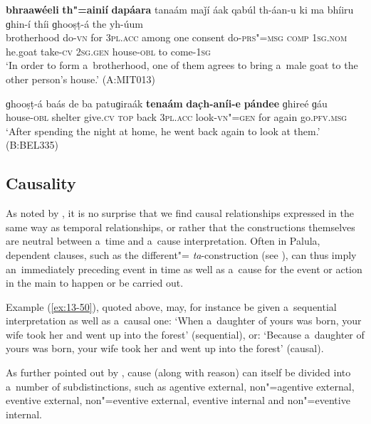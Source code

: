 \begin{exe}
\ex
\label{ex:13-84}
\gll \textbf{bhraawéeli} \textbf{th"=ainií} \textbf{dapáara} tanaám maǰí áak qabúl th-áan-u ki ma bhíiru ɡhin-í thíi ɡhooṣṭ-á the yh-úum \\
brotherhood do-\textsc{vn} for \textsc{3pl.acc} among one consent do-\textsc{prs"=msg} \textsc{comp} \textsc{1sg.nom} he.goat take-\textsc{cv} \textsc{2sg.gen}  house-\textsc{obl} to come-\textsc{1sg} \\
\glt `In order to form a~brotherhood, one of them agrees to bring a~male goat to the other person's house.' (A:MIT013)

\ex
\label{ex:13-85}
\gll ɡhooṣṭ-á baás de ba patuɡiraák \textbf{tenaám} \textbf{dac̣h-aníi-e} \textbf{pándee} ɡhireé ɡáu \\
house-\textsc{obl}  shelter give.\textsc{cv} \textsc{top} back \textsc{3pl.acc}  look-\textsc{vn"=gen} for again go.\textsc{pfv.msg} \\
\glt `After spending the night at home, he went back again to look at them.' (B:BEL335)
\end{exe}

\subsection{Causality}
\label{subsec:13-4-3}

As noted by \citet[247]{thompsonetal2007}, it is no surprise that we find causal relationships expressed in the same way as temporal relationships, or rather that the constructions themselves are neutral between a~time and a~cause interpretation. Often in Palula, dependent clauses, such as the different"= \textit{ta}-construction (see ), can thus imply an~immediately preceding event in time as well as a~cause for the event or action in the main  to happen or be carried out. 



Example (\ref{ex:13-50}), quoted above, may, for instance be given a~sequential interpretation as well as a~causal one: `When a~daughter of yours was born, your wife took her and went up into the forest' (sequential), or: `Because a~daughter of yours was born, your wife took her and went up into the forest' (causal).



As further pointed out by \citet[335]{givon2001b}, cause (along with reason) can itself be divided into a~number of subdistinctions, such as agentive external, non"=agentive external, eventive external, non"=eventive external, eventive internal and non"=eventive internal.



